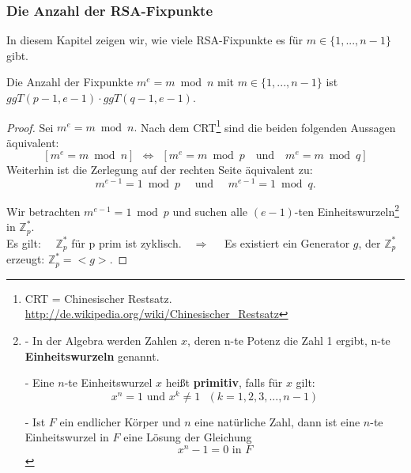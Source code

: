 \begin{refsegment}
\subsubsection{Die Anzahl der RSA-Fixpunkte}
In diesem Kapitel zeigen wir, wie viele RSA-Fixpunkte es für $m \in \{1,...,n-1\} $ gibt.\\

\begin{satz}\label{nt-number-of-fixpoints-1-to-n-1}
  Die Anzahl der Fixpunkte $ m^e = m \bmod n$ mit
  $m \in \{1,...,n-1\} $ ist \\$ ggT(p-1, e-1) \cdot ggT(q-1, e-1) $.
\end{satz}

\begin{proof}{}%
Sei $m^e = m \bmod n.$
Nach dem CRT\footnote{%
  CRT = Chinesischer Restsatz.
  \url{http://de.wikipedia.org/wiki/Chinesischer_Restsatz}
}
sind die beiden folgenden Aussagen äquivalent:\\
$$ [ m^e = m \bmod n ]~~ \Leftrightarrow ~~[ m^{e} = m \bmod p \text{ ~~und~~  } m^{e} = m \bmod q ] $$
Weiterhin ist die Zerlegung auf der rechten Seite äquivalent zu:
$$m^{e-1} = 1 \bmod p \text{ ~~~und~~~ } m^{e-1} = 1 \bmod q. $$


 Wir betrachten  $m^{e-1} = 1 \bmod p $ und  suchen alle $(e-1)$-ten
Einheitswurzeln\footnote{%
- In der Algebra werden Zahlen $x$, deren n-te Potenz die Zahl 1 ergibt, n-te \textbf{Einheitswurzeln} genannt.

- Eine $n$-te Einheitswurzel $x$ heißt \textbf{primitiv}, falls für $x$ gilt:
 $$x^{n} = 1  \text{ und }   x^{k} \neq 1 ~~~(k = 1,2, 3, ..., n-1)$$


- Ist $F$ ein endlicher Körper und $n$ eine natürliche Zahl, dann ist eine
$n$-te Einheitswurzel in $F$ eine Lösung der Gleichung $$ x^{n}-1 = 0 \text{ in } F $$
}
in $\mathbb{Z}_p^{*}.$\\
Es gilt:~~ $\mathbb{Z}_p^{*}$ für p prim ist zyklisch.~~$\Rightarrow $~~
Es existiert ein Generator $g$, der $\mathbb{Z}_p^{*}$ erzeugt: $\mathbb{Z}_p^{*}=<g>$.


\end{proof}
\end{refsegment}

